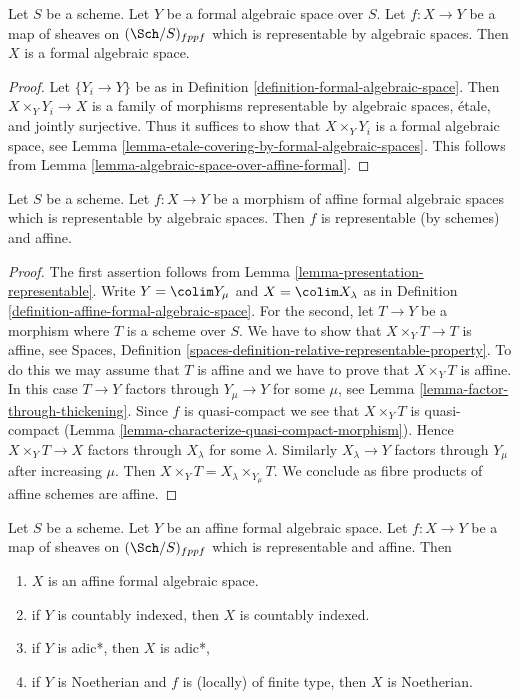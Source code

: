 \begin{lemma}
\label{lemma-representable-by-algebraic-spaces}
Let $S$ be a scheme. Let $Y$ be a formal algebraic space over $S$.
Let $f : X \to Y$ be a map of sheaves on $(\Sch/S)_{fppf}$ which is
representable by algebraic spaces. Then $X$ is a formal
algebraic space.
\end{lemma}

\begin{proof}
Let $\{Y_i \to Y\}$ be as in
Definition \ref{definition-formal-algebraic-space}.
Then $X \times_Y Y_i \to X$ is a family of morphisms
representable by algebraic spaces, \'etale, and jointly
surjective. Thus it suffices to show that
$X \times_Y Y_i$ is a formal algebraic space, see
Lemma \ref{lemma-etale-covering-by-formal-algebraic-spaces}.
This follows from Lemma \ref{lemma-algebraic-space-over-affine-formal}.
\end{proof}

\begin{lemma}
\label{lemma-affine-representable-by-algebraic-spaces}
Let $S$ be a scheme. Let $f : X \to Y$ be a morphism of
affine formal algebraic spaces which is representable by
algebraic spaces. Then $f$ is representable (by schemes) and affine.
\end{lemma}

\begin{proof}
The first assertion follows from Lemma \ref{lemma-presentation-representable}.
Write $Y = \colim Y_\mu$ and $X = \colim X_\lambda$ as in
Definition \ref{definition-affine-formal-algebraic-space}.
For the second, let $T \to Y$ be a morphism where $T$ is a scheme
over $S$. We have to show that $X \times_Y T \to T$ is affine, see
Spaces, Definition \ref{spaces-definition-relative-representable-property}.
To do this we may assume that $T$ is affine and we have to prove
that $X \times_Y T$ is affine. In this case $T \to Y$ factors
through $Y_\mu \to Y$ for some $\mu$, see
Lemma \ref{lemma-factor-through-thickening}.
Since $f$ is quasi-compact we see that $X \times_Y T$ is
quasi-compact (Lemma \ref{lemma-characterize-quasi-compact-morphism}).
Hence $X \times_Y T \to X$ factors through $X_\lambda$ for some
$\lambda$. Similarly $X_\lambda \to Y$ factors through $Y_\mu$
after increasing $\mu$. Then
$X \times_Y T = X_\lambda \times_{Y_\mu} T$.
We conclude as fibre products of affine schemes are affine.
\end{proof}

\begin{lemma}
\label{lemma-property-goes-up-affine-morphism}
Let $S$ be a scheme. Let $Y$ be an affine formal algebraic space.
Let $f : X \to Y$ be a map of sheaves on $(\Sch/S)_{fppf}$ which
is representable and affine. Then
\begin{enumerate}
\item $X$ is an affine formal algebraic space.
\item if $Y$ is countably indexed, then $X$ is countably indexed.
\item if $Y$ is adic*, then $X$ is adic*,
\item if $Y$ is Noetherian and $f$ is (locally) of finite type, then
$X$ is Noetherian.
\end{enumerate}
\end{lemma}

